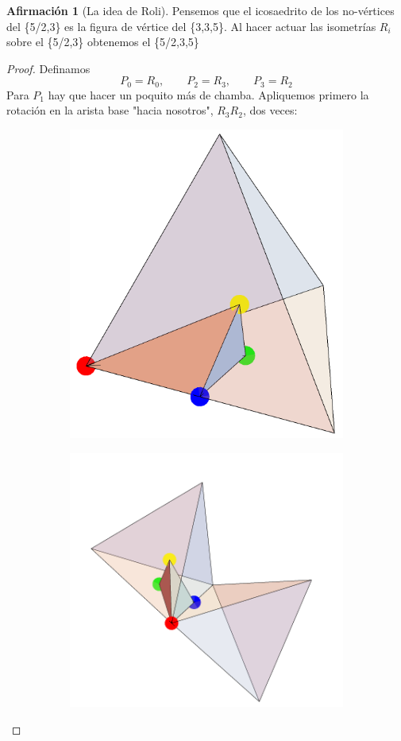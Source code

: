 \documentclass[spanish]{article}
\theoremstyle{definition}
\newtheorem*{af}{Afirmación}
\begin{document}
\begin{af}[La idea de Roli] Pensemos que el icosaedrito de los no-vértices del \{5/2,3\} es la figura de vértice del \{3,3,5\}. Al hacer actuar las isometrías $R_i$ sobre el \{5/2,3\} obtenemos el \{5/2,3,5\}
\end{af}
\begin{proof}
	Definamos 
		\[P_0=R_0,\qquad P_2=R_3,\qquad P_3=R_2\]
	Para $P_1$ hay que hacer un poquito más de chamba. Apliquemos primero la rotación en la arista base "hacia nosotros", $R_3R_2$, dos veces:
	\begin{figure}[H]
	\begin{subfigure}{0.4\linewidth}
		\centering
		\includegraphics[width=0.6\linewidth]{p5}
	\end{subfigure}
	\begin{subfigure}{0.5\linewidth}
		\centering
		\includegraphics[width=0.9\linewidth]{p6}

\end{subfigure}
\end{figure}
\end{proof}
\end{document}
